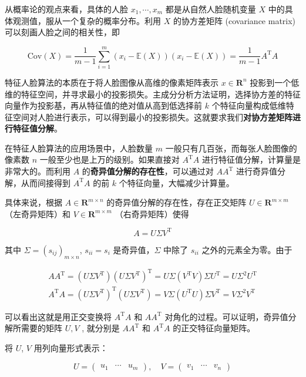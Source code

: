 从概率论的观点来看，具体的人脸 $x_1, \cdots, x_m$ 都是从自然人脸随机变量 $X$ 中的具体观测值，服从一个复杂的概率分布。利用 $X$ 的协方差矩阵 (covariance matrix) 可以刻画人脸之间的相关性，即

\[ \mathrm{Cov}(X) = \frac{1}{m-1}\sum_{i=1}^m (x_i - \mathbb{E}(X))(x_i - \mathbb{E}(X)) = \frac{1}{m-1} A^{\mathrm{T}}A \]

特征人脸算法的本质在于将人脸图像从高维的像素矩阵表示 $x\in \mathbf{R}^n$ 投影到一个低维的特征空间，并寻求最小的投影损失。主成分分析方法证明，选择协方差的特征向量作为投影基，再从特征值的绝对值从高到低选择前 $k$ 个特征向量构成低维特征空间对人脸进行表示，可以得到最小的投影损失。这就要求我们\textbf{对协方差矩阵进行特征值分解}。

在特征人脸算法的应用场景中，人脸数量 $m$ 一般只有几百张，而每张人脸图像的像素数 $n$ 一般至少也是上万的级别。如果直接对 $A^{\mathrm{T}}A$ 进行特征值分解，计算量是非常大的。而利用 $A$ 的\textbf{奇异值分解的存在性}，可以通过对 $AA^{\mathrm{T}}$ 进行奇异值分解，从而间接得到 $A^{\mathrm{T}}A$ 的前 $k$ 个特征向量，大幅减少计算量。

具体来说，根据 $A\in \mathbf{R}^{m\times n}$ 的奇异值分解的存在性，存在正交矩阵 $U\in \mathbf{R}^{m\times m}$（左奇异矩阵）和 $V\in \mathbf{R}^{m\times m}$ （右奇异矩阵）使得

\[ A = U\Sigma V^{\mathrm{T}} \]

其中 $\Sigma = (s_{ij})_{m\times n}$, $s_{ii}=s_i$ 是奇异值，$\Sigma$ 中除了 $s_{ii}$ 之外的元素全为零。由于

\begin{gather*}
    AA^{\mathrm{T}} = (U\Sigma V^{\mathrm{T}})(U\Sigma V^{\mathrm{T}})^{\mathrm{T}} = U \Sigma (V^{\mathrm{T}} V) \Sigma U^{\mathrm{T}} = U \Sigma^2 U^{\mathrm{T}} \\
    A^{\mathrm{T}}A = (U\Sigma V^{\mathrm{T}})^{\mathrm{T}}(U\Sigma V^{\mathrm{T}}) = V \Sigma (U^{\mathrm{T}} U) \Sigma V^{\mathrm{T}} = V \Sigma^2 V^{\mathrm{T}}
\end{gather*}

可以看出这就是用正交变换将 $A^{\mathrm{T}}A$ 和 $AA^{\mathrm{T}}$ 对角化的过程。可以证明，奇异值分解所需要的矩阵 $U, V$ , 就分别是 $AA^{\mathrm{T}}$ 和 $A^{\mathrm{T}}A$ 的正交特征向量矩阵。

将 $U$, $V$ 用列向量形式表示：

\[ U = \begin{pmatrix}
    u_1 & \cdots & u_m
\end{pmatrix}, \quad V = \begin{pmatrix}
    v_1 & \cdots & v_n
\end{pmatrix} \]

